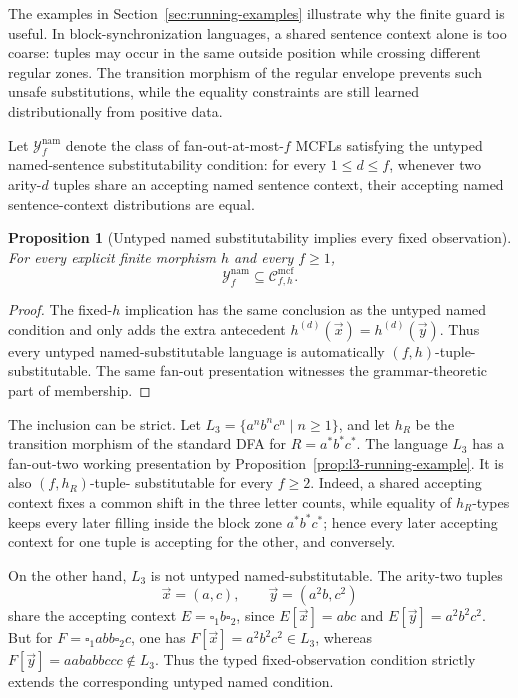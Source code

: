\documentclass[11pt,a4paper]{article}
\newtheorem{proposition}[theorem]{Proposition}
\theoremstyle{remark}
\newcommand{\Cmcf}[2]{\mathcal{C}^{\mathrm{mcf}}_{#1,#2}}
\newcommand{\Yclass}[1]{\mathcal{Y}_{#1}}
\newcommand{\tuple}[1]{\vec{#1}}
\newcommand{\blank}{\square}
\begin{document}
The examples in Section~\ref{sec:running-examples} illustrate why the finite
guard is useful.  In block-synchronization languages, a shared sentence context
alone is too coarse: tuples may occur in the same outside position while
crossing different regular zones.  The transition morphism of the regular
envelope prevents such unsafe substitutions, while the equality constraints are
still learned distributionally from positive data.

Let \(\Yclass{f}^{\mathrm{nam}}\) denote the class of fan-out-at-most-\(f\) MCFLs
satisfying the untyped named-sentence substitutability condition: for every
\(1\le d\le f\), whenever two arity-\(d\) tuples share an accepting named
sentence context, their accepting named sentence-context distributions are equal.

\begin{proposition}[Untyped named substitutability implies every fixed observation]
\label{prop:untyped-named-implies-fixed-h}
For every explicit finite morphism \(h\) and every \(f\ge1\),
\[
  \Yclass{f}^{\mathrm{nam}}\subseteq \Cmcf{f}{h}.
\]
\end{proposition}

\begin{proof}
The fixed-\(h\) implication has the same conclusion as the untyped named
condition and only adds the extra antecedent
\(h^{(d)}(\tuple x)=h^{(d)}(\tuple y)\).  Thus every untyped named-substitutable
language is automatically \((f,h)\)-tuple-substitutable.  The same fan-out
presentation witnesses the grammar-theoretic part of membership.
\end{proof}

The inclusion can be strict.  Let \(L_3=\{a^n b^n c^n\mid n\ge1\}\), and let
\(h_R\) be the transition morphism of the standard DFA for \(R=a^*b^*c^*\).
The language \(L_3\) has a fan-out-two working presentation by
Proposition~\ref{prop:l3-running-example}.  It is also \((f,h_R)\)-tuple-
substitutable for every \(f\ge2\).  Indeed, a shared accepting context fixes a
common shift in the three letter counts, while equality of \(h_R\)-types keeps
every later filling inside the block zone \(a^*b^*c^*\); hence every later
accepting context for one tuple is accepting for the other, and conversely.

On the other hand, \(L_3\) is not untyped named-substitutable.  The arity-two
tuples
\[
  \tuple x=(a,c),
  \qquad
  \tuple y=(a^2b,c^2)
\]
share the accepting context \(E=\blank_1 b\blank_2\), since
\(E[\tuple x]=abc\) and \(E[\tuple y]=a^2b^2c^2\).  But for
\(F=\blank_1 abb\blank_2 c\), one has
\(F[\tuple x]=a^2b^2c^2\in L_3\), whereas
\(F[\tuple y]=aababbccc\notin L_3\).  Thus the typed fixed-observation condition
strictly extends the corresponding untyped named condition.
\end{document}
